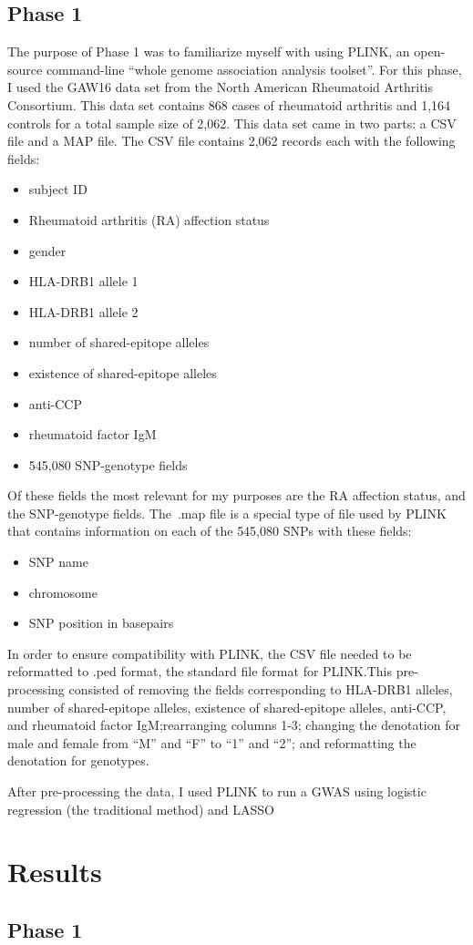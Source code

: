 \documentclass{article}
\begin{document}
\subsection*{Phase 1}
The purpose of Phase 1 was to familiarize myself with using PLINK, an open-source 
command-line ``whole genome association analysis toolset''\cite{Chang}. For this 
phase, I used the GAW16 data set from the North American Rheumatoid Arthritis 
Consortium. This data set contains 868 cases of rheumatoid arthritis and 1,164 controls for a total sample size of 2,062. 
This data set came in two parts: a CSV file and a MAP file. The 
CSV file contains 2,062 records each with the following fields:
\begin{itemize}
    \item{subject ID}
    \item{Rheumatoid arthritis (RA) affection status}
    \item{gender}
    \item{HLA-DRB1 allele 1}
    \item{HLA-DRB1 allele 2}
    \item{number of shared-epitope alleles}
    \item{existence of shared-epitope alleles}
    \item{anti-CCP}
    \item{rheumatoid factor IgM}
    \item{545,080 SNP-genotype fields}
\end{itemize}
Of these fields the most relevant for my purposes are the RA affection status, 
and the SNP-genotype fields. The\ .map file is a special type of file used by 
PLINK that contains information on each of the 545,080 SNPs with these fields:
\begin{itemize}
    \item{SNP name}
    \item{chromosome}
    \item{SNP position in basepairs}
\end{itemize}

In order to ensure compatibility with PLINK, the CSV file needed to be 
reformatted to .ped format, the standard file format for PLINK.\@ This 
pre-processing consisted of removing the fields corresponding to HLA-DRB1 
alleles, number of shared-epitope alleles, existence of shared-epitope alleles, 
anti-CCP, and rheumatoid factor IgM;\@ rearranging columns 1-3; changing the 
denotation for male and female from ``M'' and ``F'' to ``1'' and ``2''; and
reformatting the denotation for genotypes.

After pre-processing the data, I used PLINK to run a GWAS using logistic 
regression (the traditional method) and LASSO

\section*{Results}
\subsection*{Phase 1}





\end{document}
